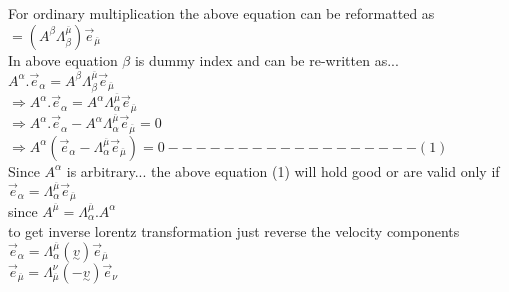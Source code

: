 \documentclass[11pt,a4paper]{article}
\begin{document}
\begin{enumerate}
\begin{enumerate}
                        For ordinary multiplication the above equation can be reformatted as\\
                        $=\left(A^{\beta} \Lambda^{\overline{\mu}}_{\beta} \right)\vec{e}_{\overline{\mu}}$\\
                        In above equation $\beta$ is dummy index and can be re-written as...\\
                        $A^{\alpha}.\vec{e}_{\alpha} = A^{\beta}  \Lambda^{\overline{\mu}}_{\beta}\vec{e}_{\overline{\mu}}$\\
                        $\Rightarrow A^{\alpha}.\vec{e}_{\alpha} = A^{\alpha}  \Lambda^{\overline{\mu}}_{\alpha}\vec{e}_{\overline{\mu}}$\\
                        $\Rightarrow A^{\alpha}.\vec{e}_{\alpha} - A^{\alpha}  \Lambda^{\overline{\mu}}_{\alpha}\vec{e}_{\overline{\mu}}=0$\\
                        $\Rightarrow A^{\alpha}\left(\vec{e}_{\alpha} - \Lambda^{\overline{\mu}}_{\alpha}\vec{e}_{\overline{\mu}}\right)=0------------------(1)$\\
                        Since $A^{\alpha}$ is arbitrary... the above equation (1) will hold good or are valid only if\\
                        $\vec{e}_{\alpha} = \Lambda^{\overline{\mu}}_{\alpha}\vec{e}_{\overline{\mu}}$\\
                        since $A^{\overline{\mu}}=\Lambda^{\overline{\mu}}_{\alpha}.A^{\alpha}$\\
                        to get inverse lorentz transformation just reverse the velocity components\\

                        $\vec{e}_{\alpha} = \Lambda^{\overline{\mu}}_{\alpha}(\underset{\sim}{v})\vec{e}_{\overline{\mu}}$\\

                        $\vec{e}_{\overline{\mu}} = \Lambda^{\nu}_{\overline{\mu}}(-\underset{\sim}{v})\vec{e}_{\nu} $\\


\end{enumerate}
\end{enumerate}
\end{document}
